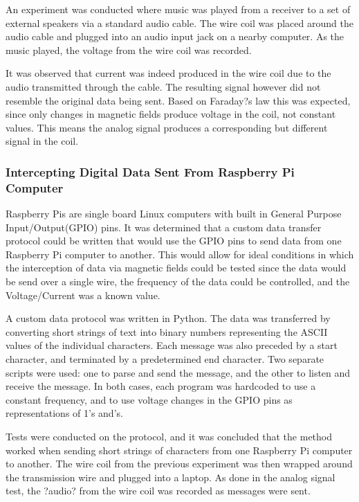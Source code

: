 \documentclass{article}
\begin{document}
An experiment was conducted where music was played from a receiver to a set of external speakers via a standard audio cable. The wire coil was placed around the audio cable and plugged into an audio input jack on a nearby computer. As the music played, the voltage from the wire coil was recorded.

It was observed that current was indeed produced in the wire coil due to the audio transmitted through the cable. The resulting signal however did not resemble the original data being sent. Based on Faraday?s law this was expected, since only changes in magnetic fields produce voltage in the coil, not constant values. This means the analog signal produces a corresponding but different signal in the coil.

\subsubsection{Intercepting Digital Data Sent From Raspberry Pi Computer}

Raspberry Pis are single board Linux computers with built in General Purpose Input/Output(GPIO) pins. It was determined that a custom data transfer protocol could be written that would use the GPIO pins to send data from one Raspberry Pi computer to another. This would allow for ideal conditions in which the interception of data via magnetic fields could be tested since the data would be send over a single wire, the frequency of the data could be controlled, and the Voltage/Current was a known value.

A custom data protocol was written in Python. The data was transferred by converting short strings of text into binary numbers representing the ASCII values of the individual characters. Each message was also preceded by a start character, and terminated by a predetermined end character. Two separate scripts were used: one to parse and send the message, and the other to listen and receive the message. In both cases, each program was hardcoded to use a constant frequency, and to use voltage changes in the GPIO pins as representations of 1\textquoteright s and\textquoteright s.

Tests were conducted on the protocol, and it was concluded that the method worked when sending short strings of characters from one Raspberry Pi computer to another. The wire coil from the previous experiment was then wrapped around the transmission wire and plugged into a laptop. As done in the analog signal test, the ?audio? from the wire coil was recorded as messages were sent.
\end{document}
